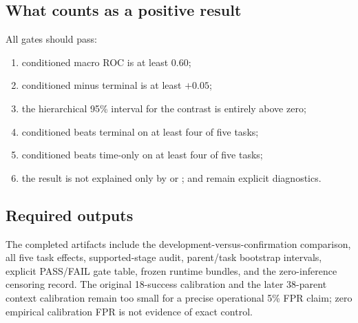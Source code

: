 \subsection{What counts as a positive result}

All gates should pass:
\begin{enumerate}
  \item conditioned macro ROC is at least 0.60;
  \item conditioned minus terminal is at least $+0.05$;
  \item the hierarchical 95\% interval for the contrast is entirely above zero;
  \item conditioned beats terminal on at least four of five tasks;
  \item conditioned beats time-only on at least four of five tasks;
  \item the result is not explained only by  or ;  and  remain explicit diagnostics.
\end{enumerate}


\subsection{Required outputs}

The completed artifacts include the development-versus-confirmation comparison, all five task effects, supported-stage audit, parent/task bootstrap intervals, explicit PASS/FAIL gate table, frozen runtime bundles, and the zero-inference censoring record. The original 18-success calibration and the later 38-parent context calibration remain too small for a precise operational 5\% FPR claim; zero empirical calibration FPR is not evidence of exact control.
